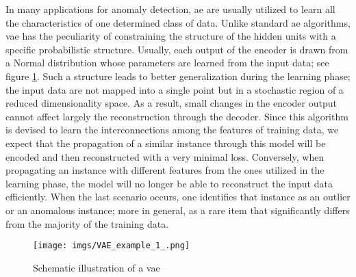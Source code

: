 In many applications for anomaly detection, \gls{ae} are usually utilized to learn all the characteristics of one determined class of data.
Unlike standard \gls{ae} algorithms, \gls{vae} has the peculiarity of constraining the structure of the hidden units with a specific probabilistic structure.
Usually, each output of the encoder is drawn from a Normal distribution whose parameters are learned from the input data; see figure \ref{fig: scheme_vae}.  
Such a structure leads to better generalization during the learning phase; the input data are not mapped into a single point but in a stochastic region of a reduced dimensionality space.
As a result, small changes in the encoder output cannot affect largely the reconstruction through the decoder.
Since this algorithm is devised to learn the interconnections among the features of training data, we expect that the propagation of a similar instance through this model will be encoded and then reconstructed with a very minimal loss.
Conversely, when propagating an instance with different features from the ones utilized in the learning phase, the model will no longer be able to reconstruct the input data efficiently.
When the last scenario occurs, one identifies that instance as an outlier or an anomalous instance; more in general, as a rare item that significantly differs from the majority of the training data. 
\begin{figure}[!]
    \centering
\texttt{[image: imgs/VAE\_example\_1\_.png]}
    \caption{Schematic illustration of a \gls{vae}}
    \label{fig: scheme_vae}
\end{figure}

